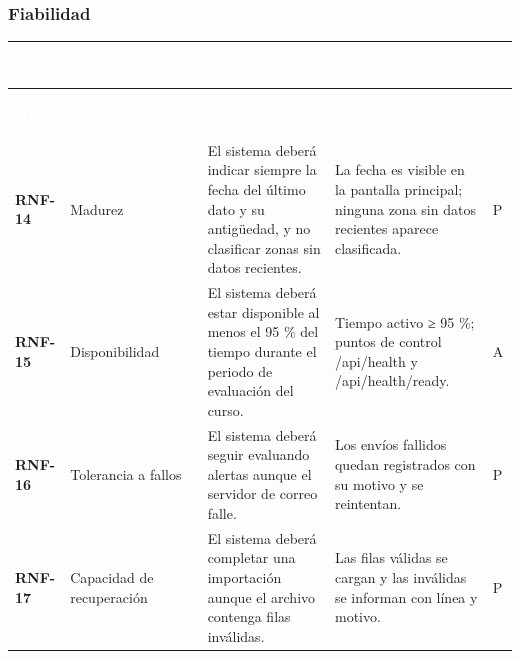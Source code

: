 \documentclass[11pt,a4paper,oneside]{article}
\begin{document}
\subsubsection{Fiabilidad}

{\footnotesize
\begin{xltabular}{\textwidth}{@{}>{\sffamily\bfseries}p{1.45cm}>{\raggedright\arraybackslash}p{2.4cm}YY>{\raggedright\arraybackslash}p{0.45cm}@{}}
\textcolor{white}{\sffamily\bfseries\footnotesize ID} & \textcolor{white}{\sffamily\bfseries\footnotesize Subcaracterística} & \textcolor{white}{\sffamily\bfseries\footnotesize Enunciado} & \textcolor{white}{\sffamily\bfseries\footnotesize Criterio de aceptación} & \textcolor{white}{\sffamily\bfseries\footnotesize V}\\
\endfirsthead
{}\\
\textcolor{white}{\sffamily\bfseries\footnotesize ID} & \textcolor{white}{\sffamily\bfseries\footnotesize Subcaracterística} & \textcolor{white}{\sffamily\bfseries\footnotesize Enunciado} & \textcolor{white}{\sffamily\bfseries\footnotesize Criterio de aceptación} & \textcolor{white}{\sffamily\bfseries\footnotesize V}\\
\endhead
RNF-14 & Madurez & El sistema deberá indicar siempre la fecha del último dato y su antigüedad, y no clasificar zonas sin datos recientes. & La fecha es visible en la pantalla principal; ninguna zona sin datos recientes aparece clasificada. & P\\ \hline
{}RNF-15 & Disponibilidad & El sistema deberá estar disponible al menos el 95 \% del tiempo durante el periodo de evaluación del curso. & Tiempo activo ≥ 95 \%; puntos de control /api/health y /api/health/ready. & A\\ \hline
RNF-16 & Tolerancia a fallos & El sistema deberá seguir evaluando alertas aunque el servidor de correo falle. & Los envíos fallidos quedan registrados con su motivo y se reintentan. & P\\ \hline
{}RNF-17 & Capacidad de recuperación & El sistema deberá completar una importación aunque el archivo contenga filas inválidas. & Las filas válidas se cargan y las inválidas se informan con línea y motivo. & P\\ \hline
\end{xltabular}}
\vspace{0.6em}
\end{document}
